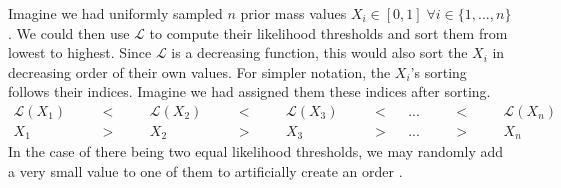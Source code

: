 \documentclass[12pt, a4paper]{report}
\begin{document}
Imagine we had uniformly sampled $n$ prior mass values $X_i \in [0,1] \; \forall i \in \{1, ..., n\}$.
We could then use $\mathcal{L}$ to compute their likelihood thresholds and sort them from lowest to highest.
Since $\mathcal{L}$ is a decreasing function, this would also sort the $X_i$ in decreasing order of their own values.
For simpler notation, the $X_i$'s sorting follows their indices.
Imagine we had assigned them these indices after sorting.
\begin{align}
    \mathcal{L}(X_1)& &<& &\mathcal{L}(X_2)& &<& &\mathcal{L}(X_3) &\quad&<&   &...& &<& &\mathcal{L}(X_n) \nonumber\\
    X_1 & \quad &>& \quad &X_2 & \quad &>& \quad &X_3 &\quad&>& &...& \quad &>& \quad &X_n \label{eq:sample_ordering}
\end{align}
In the case of there being two equal likelihood thresholds, we may randomly add a very small value to one of them to artificially create an order \cite[3]{skilling}.
\end{document}
